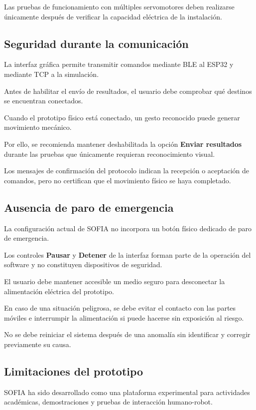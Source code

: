 \documentclass[letterpaper,journal]{IEEEtran}
\begin{document}
Las pruebas de funcionamiento
con múltiples servomotores deben
realizarse únicamente después
de verificar la capacidad eléctrica
de la instalación.

\subsection{Seguridad durante la comunicación}

La interfaz gráfica permite transmitir
comandos mediante BLE al ESP32 y
mediante TCP a la simulación.

Antes de habilitar el envío de
resultados, el usuario debe
comprobar qué destinos se
encuentran conectados.

Cuando el prototipo físico está
conectado, un gesto reconocido
puede generar movimiento mecánico.

Por ello, se recomienda mantener
deshabilitada la opción
\textbf{Enviar resultados}
durante las pruebas que únicamente
requieran reconocimiento visual.

Los mensajes de confirmación
del protocolo indican la
recepción o aceptación de
comandos, pero no certifican
que el movimiento físico
se haya completado.

\subsection{Ausencia de paro de emergencia}

La configuración actual de SOFIA
no incorpora un botón físico
dedicado de paro de emergencia.

Los controles \textbf{Pausar}
y \textbf{Detener} de la interfaz
forman parte de la operación
del software y no constituyen
dispositivos de seguridad.

El usuario debe mantener
accesible un medio seguro
para desconectar la alimentación
eléctrica del prototipo.

En caso de una situación
peligrosa, se debe evitar
el contacto con las partes
móviles e interrumpir
la alimentación si puede
hacerse sin exposición al riesgo.

No se debe reiniciar el
sistema después de una anomalía
sin identificar y corregir
previamente su causa.

\subsection{Limitaciones del prototipo}

SOFIA ha sido desarrollado
como una plataforma experimental
para actividades académicas,
demostraciones y pruebas
de interacción humano-robot.
\end{document}
